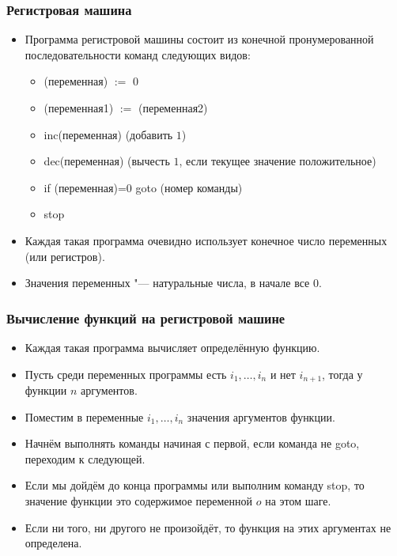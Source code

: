 \documentclass[10pt]{beamer}
\begin{document}
\begin{frame}
    \frametitle{Регистровая машина}
    \begin{itemize}
        \item Программа регистровой машины состоит из конечной пронумерованной последовательности команд следующих видов:
        \begin{itemize}
            \item (переменная) $:=$ 0
            \item (переменная1) $:=$ (переменная2)
            \item inc(переменная) (добавить $1$)
            \item dec(переменная) (вычесть $1$, если текущее значение положительное)
            \item if (переменная)=0 goto (номер команды)
            \item stop
        \end{itemize}
        \item Каждая такая программа очевидно использует конечное число переменных (или регистров).
        \item Значения переменных "--- натуральные числа, в начале все $0$.
    \end{itemize}
\end{frame}

\begin{frame}
    \frametitle{Вычисление функций на регистровой машине}
    \begin{itemize}
        \item Каждая такая программа вычисляет определённую функцию.
        \item Пусть среди переменных программы есть $i_1, \ldots, i_n$ и нет $i_{n+1}$, тогда у функции $n$ аргументов.
        \item Поместим в переменные $i_1, \ldots, i_n$ значения аргументов функции.
        \item Начнём выполнять команды начиная с первой, если команда не goto, переходим к следующей.
        \item Если мы дойдём до конца программы или выполним команду stop, то значение функции это содержимое переменной $o$ на этом шаге.
        \item Если ни того, ни другого не произойдёт, то функция на этих аргументах не определена.
    \end{itemize}
\end{frame}
\end{document}
